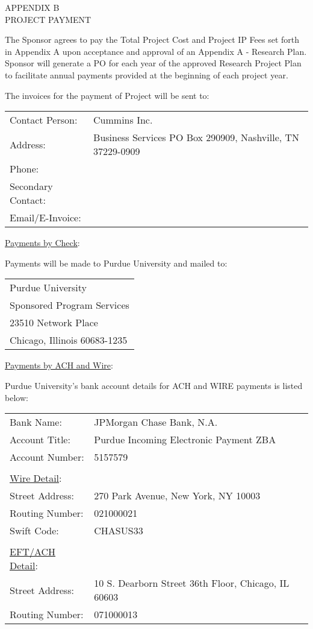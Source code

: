 \begin{center}
    APPENDIX B\\
    \bigskip
    PROJECT PAYMENT
\end{center}


The Sponsor agrees to pay the Total Project Cost and Project IP Fees set forth
in Appendix A upon acceptance and approval of an Appendix A - Research Plan.
Sponsor will generate a PO for each year of the approved Research Project Plan
to facilitate annual payments provided at the beginning of each project year.


The invoices for the payment of Project will be sent to:

\begin{table}[H]
    \centering
    \begin{tabular}{l l}
        Contact Person: & Cummins Inc.\\
        Address: & Business Services PO Box 290909, Nashville, TN  37229-0909 \\
        Phone: & \\
        Secondary Contact: & \\
        Email/E-Invoice: &
    \end{tabular}
\end{table}

\underline{Payments by Check}:

Payments will be made to Purdue University and mailed to:
\begin{table}[H]
    \centering
    \begin{tabular}{l}
        Purdue University\\
        Sponsored Program Services\\
        23510 Network Place\\
        Chicago, Illinois 60683-1235
    \end{tabular}
\end{table}


\underline{Payments by ACH and Wire}:

Purdue University's bank account details for ACH and WIRE payments is listed
below:
\begin{table}[H]
    \begin{tabular}{l l}
        Bank Name: 		    &JPMorgan Chase Bank, N.A.\\
        Account Title: 		&Purdue Incoming Electronic Payment ZBA\\
        Account Number: 	&5157579\\
        &\\
        \underline{Wire Detail}:&\\
        Street Address: 	&270 Park Avenue, New York, NY 10003\\
        Routing Number: 	&021000021\\
        Swift Code: 		&CHASUS33\\
        &\\
        \underline{EFT/ACH Detail}:&\\
        Street Address: 		&10 S. Dearborn Street 36th Floor, Chicago, IL 60603\\
        Routing Number: 	&071000013
    \end{tabular}
\end{table}



